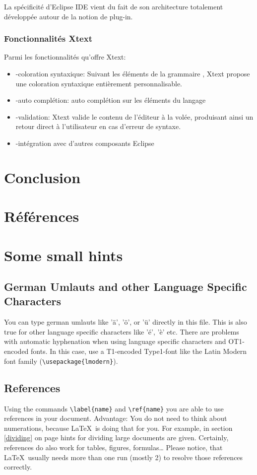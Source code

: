 \documentclass{article}
\begin{document}
{La spécificité d'Eclipse IDE vient du fait de son architecture totalement développée autour de la notion de plug-in.


\subsubsection{Fonctionnalités Xtext}
Parmi les fonctionnalités qu’offre Xtext:
\begin{itemize}
			\item -coloration syntaxique: Suivant les éléments de la grammaire , Xtext propose une coloration syntaxique entièrement     personnalisable.
			\item -auto complétion: auto complétion sur les éléments du langage 
			\item -validation: Xtext valide le contenu de l'éditeur à la volée, produisant ainsi un retour direct à l’utilisateur en cas d’erreur de syntaxe.
			\item -intégration avec d’autres composants Eclipse 
\end{itemize}

\section{Conclusion}
\label{hints}

\section{Références}
\label{hints}
\section{Some small hints}
\label{hints}
\subsection{German Umlauts and other Language Specific Characters}
\label{umlauts}
You can type german umlauts like 'ä', 'ö', or 'ü' directly in this file.
This is also true for other language specific characters like 'é', 'è' etc.
There are problems with automatic hyphenation when using language
specific characters and OT1-encoded fonts. In this case, use a
T1-encoded Type1-font like the Latin Modern font family (\verb#\usepackage{lmodern}#).
\subsection{References}
\label{references}
Using the commands \verb#\label{name}# and \verb#\ref{name}# you are able
to use references in your document. Advantage: You do not need to think
about numerations, because \LaTeX\ is doing that for you.
For example, in section \ref{dividing} on page \pageref{dividing} hints for
dividing large documents are given.
Certainly, references do also work for tables, figures, formulas\ldots
Please notice, that \LaTeX\ usually needs more than one run (mostly 2) to
resolve those references correctly.
}
\end{document}
